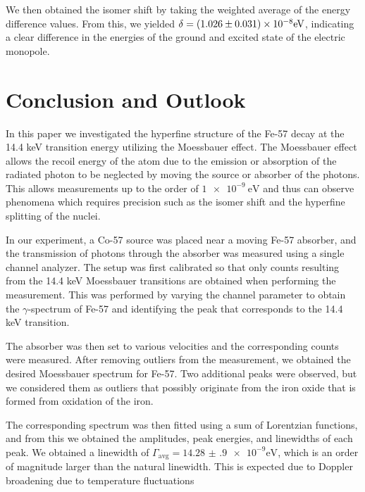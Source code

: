 \documentclass[a4paper]{report}
\numberwithin{equation}{section}
\begin{document}
We then obtained the isomer shift by taking the weighted average of the energy difference values. From this, we yielded
$\delta = \num[scientific-notation=true]{0.1026(31)e-7}\si[]{\electronvolt}$, indicating a clear difference in the 
energies of the ground and excited state of the electric monopole. \par 

\chapter{Conclusion and Outlook}

In this paper we investigated the hyperfine structure of the Fe-57 decay
 at the 14.4 keV transition energy utilizing the Moessbauer effect. The Moessbauer effect
 allows the recoil energy of the atom due to the emission or absorption of the radiated
 photon to be neglected by moving the source or absorber of the photons. This allows measurements 
 up to the order of $\SI{1e-9}{\electronvolt}$ and thus can observe phenomena which requires 
 precision such as the isomer shift and the hyperfine splitting of the nuclei. \par
 
 In our experiment, a Co-57 source was placed near a moving Fe-57 absorber, and the transmission 
 of photons through the absorber was measured using a single channel analyzer. The setup was 
 first calibrated so that only counts resulting from the 14.4 keV Moessbauer transitions are obtained when 
 performing the measurement. This was performed by varying the channel parameter to obtain the 
 $\gamma$-spectrum of Fe-57 and identifying the peak that corresponds to the 14.4 keV transition. \par 

 The absorber was then set to various velocities and the corresponding counts were measured. 
 After removing outliers from the measurement, we obtained the desired Moessbauer
 spectrum for Fe-57. Two additional peaks were observed, but we considered them as outliers 
 that possibly originate from the iron oxide that is formed from oxidation of the iron. \par
 
 The corresponding spectrum was then fitted using a sum of Lorentzian 
 functions, and from this we obtained the amplitudes, peak energies, and linewidths of 
 each peak. We obtained a linewidth of $\Gamma_{\mathrm{avg}} = \num[{scientific-notation = true}]{14.28(90)e-9}\si{\electronvolt}$,
 which is an order of magnitude larger than the natural linewidth. This is expected due to 
 Doppler broadening due to temperature fluctuations \par
 
\end{document}

